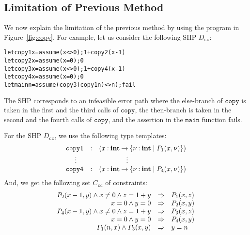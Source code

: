 \subsection{Limitation of Previous Method}
\label{sec:limit}

We now explain the limitation of the previous method by using the
program in Figure~\ref{fig:copy}.  For example, let us consider the
following SHP \(D_{\texttt{cc}}\):
\begin{alltt}
let copy1 x = assume (x<>0); 1 + copy2 (x-1)
let copy2 x = assume (x=0); 0
let copy3 x = assume (x<>0); 1 + copy4 (x-1)
let copy4 x = assume (x=0); 0
let main n = assume (copy3 (copy1 n) <> n); fail
\end{alltt}
The SHP corresponds to an infeasible error path where the else-branch of
\(\texttt{copy}\) is taken in the first and the third calls of
\(\texttt{copy}\), the then-branch is taken in the second and the fourth
calls of \(\texttt{copy}\), and the assertion in the \(\texttt{main}\)
function fails.

For the SHP \(D_{\texttt{cc}}\), we use the following type templates:
\[
\begin{array}{rcl}
\texttt{copy1}&\mathbin{:}&(x\mathbin{:}{\mathbf{int}}\mathbin{\rightarrow}{\{{\nu\mathbin{:}\mathbf{int} \mid P_1(x,\nu)}\}}) \\
\vdots\quad &&\qquad\qquad \vdots \\
\texttt{copy4}&\mathbin{:}&(x\mathbin{:}{\mathbf{int}}\mathbin{\rightarrow}{\{{\nu\mathbin{:}\mathbf{int} \mid P_4(x,\nu)}\}})
\end{array}
\]
And, we get the following set \(C_{\texttt{cc}}\) of constraints:
\[
\begin{array}{rcl}
P_2(x-1,y) \land x\neq0 \land z=1+y &\Rightarrow& P_1(x,z) \\
x=0 \land y=0 &\Rightarrow& P_2(x,y) \\
P_4(x-1,y) \land x\neq0 \land z=1+y &\Rightarrow& P_3(x,z) \\
x=0 \land y=0 &\Rightarrow& P_4(x,y) \\
P_1(n,x) \land P_3(x,y) &\Rightarrow& y=n
\end{array}
\]

